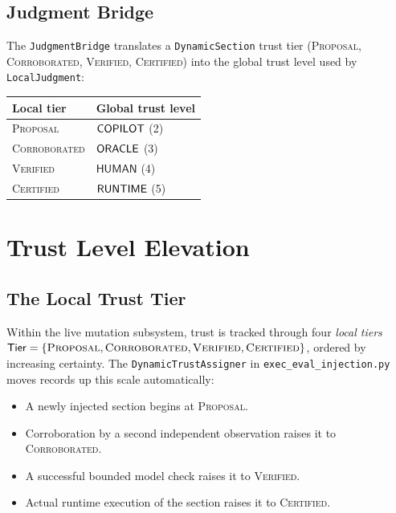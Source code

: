 \documentclass[11pt]{article}
\newcommand{\Thuman}{\mathsf{HUMAN}}             %
\newcommand{\TierLocal}{\mathsf{Tier}}           %
\begin{document}
\subsection{Judgment Bridge}
\label{subsec:judgment-bridge}

The \texttt{JudgmentBridge} translates a \texttt{DynamicSection} trust
tier (\textsc{Proposal}, \textsc{Corroborated}, \textsc{Verified},
\textsc{Certified}) into the global trust level used by
\texttt{LocalJudgment}:

\begin{center}
\begin{tabular}{ll}
\toprule
Local tier & Global trust level \\
\midrule
\textsc{Proposal}     & $\mathsf{COPILOT}$ (2) \\
\textsc{Corroborated} & $\mathsf{ORACLE}$ (3) \\
\textsc{Verified}     & $\Thuman$ (4) \\
\textsc{Certified}    & $\mathsf{RUNTIME}$ (5) \\
\bottomrule
\end{tabular}
\end{center}

\section{Trust Level Elevation}
\label{sec:trust}

\subsection{The Local Trust Tier}
\label{subsec:local-tier}

Within the live mutation subsystem, trust is tracked through four
\emph{local tiers} $\TierLocal = \{\textsc{Proposal}, \textsc{Corroborated},
\textsc{Verified}, \textsc{Certified}\}$, ordered by increasing
certainty.  The \texttt{DynamicTrustAssigner} in
\texttt{exec\_eval\_injection.py} moves records up this scale
automatically:
\begin{itemize}
\item A newly injected section begins at \textsc{Proposal}.
\item Corroboration by a second independent observation raises it to
      \textsc{Corroborated}.
\item A successful bounded model check raises it to \textsc{Verified}.
\item Actual runtime execution of the section raises it to
      \textsc{Certified}.
\end{itemize}
\end{document}
